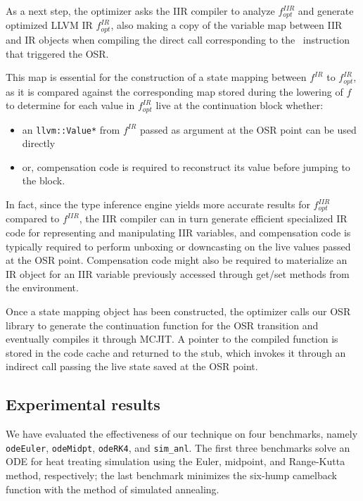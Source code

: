 As a next step, the optimizer asks the IIR compiler to analyze $f^{IIR}_{opt}$ and generate optimized LLVM IR $f^{IR}_{opt}$, also making a copy of the variable map between IIR and IR objects when compiling the direct call corresponding to the \feval\ instruction that triggered the OSR.

This map is essential for the construction of a state mapping between $f^{IR}$ to $f^{IR}_{opt}$, as it is compared against the corresponding map stored during the lowering of $f$ to determine for each value in $f^{IR}_{opt}$ live at the continuation block whether:
\begin{itemize}
\item an {\tt llvm::Value*} from $f^{IR}$ passed as argument at the OSR point can be used directly
\item or, compensation code is required to reconstruct its value before jumping to the block.
\end{itemize}

In fact, since the type inference engine yields more accurate results for $f^{IIR}_{opt}$ compared to $f^{IIR}$, the IIR compiler can in turn generate efficient specialized IR code for representing and manipulating IIR variables, and compensation code is typically required to perform unboxing or downcasting on the live values passed at the OSR point. Compensation code might also be required to materialize an IR object for an IIR variable previously accessed through get/set methods from the environment.

Once a state mapping object has been constructed, the optimizer calls our OSR library to generate the continuation function for the OSR transition and eventually compiles it through MCJIT. A pointer to the compiled function is stored in the code cache and returned to the stub, which invokes it through an indirect call passing the live state saved at the OSR point.

\subsection{Experimental results}
We have evaluated the effectiveness of our technique on four benchmarks, namely {\tt odeEuler}, {\tt odeMidpt}, {\tt odeRK4}, and {\tt sim_anl}. The first three benchmarks solve an ODE for heat treating simulation using the Euler, midpoint, and Range-Kutta method, respectively; the last benchmark minimizes the six-hump camelback function with the method of simulated annealing.
  
  
  
  
  
  
  
  
  
  
  
  
  
  
  
  
  
  